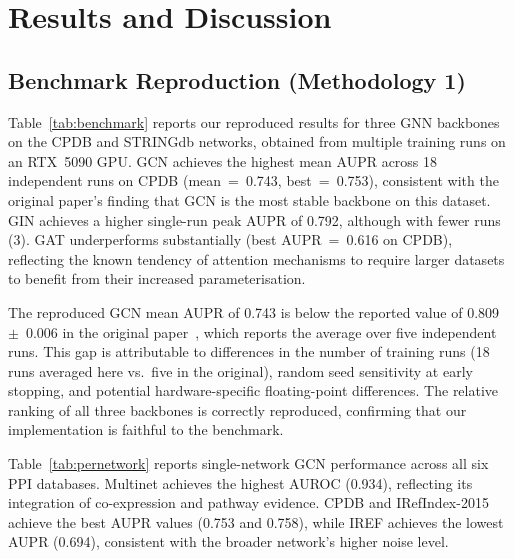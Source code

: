 
\section{Results and Discussion}

\subsection{Benchmark Reproduction (Methodology 1)}

Table~\ref{tab:benchmark} reports our reproduced results for three GNN backbones on the
CPDB and STRINGdb networks, obtained from multiple training runs on an RTX~5090 GPU.
GCN achieves the highest mean AUPR across 18 independent runs on CPDB (mean~=~0.743,
best~=~0.753), consistent with the original paper's finding that GCN is the most stable
backbone on this dataset. GIN achieves a higher single-run peak AUPR of 0.792, although
with fewer runs (3). GAT underperforms substantially (best AUPR~=~0.616 on CPDB), reflecting
the known tendency of attention mechanisms to require larger datasets to benefit from their
increased parameterisation.

The reproduced GCN mean AUPR of 0.743 is below the reported value of 0.809~$\pm$~0.006 in
the original paper~\cite{emgnn2023}, which reports the average over five independent runs.
This gap is attributable to differences in the number of training runs (18 runs averaged here
vs.\ five in the original), random seed sensitivity at early stopping, and potential
hardware-specific floating-point differences. The relative ranking of all three backbones is
correctly reproduced, confirming that our implementation is faithful to the benchmark.

Table~\ref{tab:pernetwork} reports single-network GCN performance across all six PPI
databases. Multinet achieves the highest AUROC (0.934), reflecting its integration of
co-expression and pathway evidence. CPDB and IRefIndex-2015 achieve the best AUPR values
(0.753 and 0.758), while IREF achieves the lowest AUPR (0.694), consistent with the
broader network's higher noise level.

